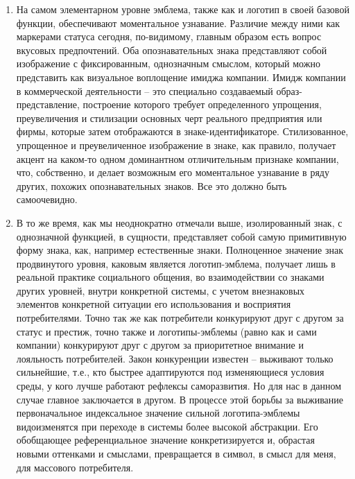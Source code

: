 \begin{enumerate}
\item На самом элементарном уровне эмблема, также как и логотип в
  своей базовой функции, обеспечивают моментальное узнавание. Различие
  между ними как маркерами статуса сегодня, по-видимому, главным образом
  есть вопрос вкусовых предпочтений. Оба опознавательных знака представляют
  собой изображение с фиксированным, однозначным смыслом, который можно представить
  как визуальное воплощение имиджа компании. Имидж компании  в коммерческой
  деятельности -- это специально создаваемый образ-представление, построение
  которого требует определенного упрощения, преувеличения и стилизации основных
  черт реального предприятия или фирмы, которые затем отображаются в знаке-идентификаторе.
  Стилизованное, упрощенное и преувеличенное изображение в знаке, как правило, получает
  акцент на каком-то одном доминантном отличительным признаке компании, что, собственно,
  и делает возможным его моментальное узнавание в ряду других, похожих опознавательных
  знаков\autocite{raigorodski2001}\autocite{melnik2001}\autocite[][88-99]{karasik2011}. Все это должно быть самоочевидно.
\item В то же время, как мы неоднократно отмечали выше, изолированный знак, с
  однозначной функцией, в сущности, представляет собой самую примитивную форму знака,
  как, например естественные знаки. Полноценное значение знак продвинутого уровня,
  каковым является логотип-эмблема, получает лишь в реальной практике социального общения,
  во взаимодействии со знаками других уровней, внутри конкретной системы,
  с учетом внезнаковых элементов конкретной ситуации его использования и восприятия
  потребителями. Точно так же как потребители конкурируют друг с другом за статус
  и престиж, точно также и логотипы-эмблемы (равно как и сами компании) конкурируют
  друг с другом за приоритетное внимание и лояльность потребителей. Закон конкуренции
  известен -- выживают только сильнейшие, т.е., кто быстрее адаптируются под
  изменяющиеся условия среды, у кого лучше работают рефлексы саморазвития\autocite{simonov1987}.
  Но для нас в данном случае главное заключается в другом. В процессе этой борьбы
  за выживание первоначальное индексальное значение сильной логотипа-эмблемы
  видоизменятся при переходе в системы более высокой абстракции. Его обобщающее
  референциальное значение конкретизируется и, обрастая новыми оттенками и смыслами,
  превращается в символ, в смысл для меня, для массового потребителя.
\end{enumerate}

